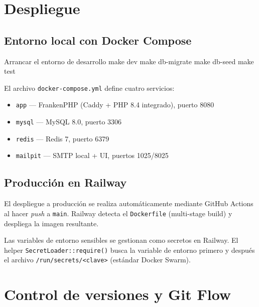 \documentclass[12pt,a4paper,twoside,openright]{report}
\begin{document}
\section{Despliegue}
\label{sec:despliegue}

\subsection{Entorno local con Docker Compose}

\begin{bashcode}{Arrancar el entorno de desarrollo}
make dev
make db-migrate
make db-seed
make test
\end{bashcode}

El archivo \texttt{docker-compose.yml} define cuatro servicios:
\begin{itemize}[nosep]
  \item \texttt{app} — FrankenPHP (Caddy + PHP 8.4 integrado), puerto 8080
  \item \texttt{mysql} — MySQL 8.0, puerto 3306
  \item \texttt{redis} — Redis 7, puerto 6379
  \item \texttt{mailpit} — SMTP local + UI, puertos 1025/8025
\end{itemize}

\subsection{Producción en Railway}

El despliegue a producción se realiza automáticamente mediante GitHub Actions al
hacer \textit{push} a \texttt{main}. Railway detecta el \texttt{Dockerfile}
(multi-stage build) y despliega la imagen resultante.

Las variables de entorno sensibles se gestionan como secretos en Railway. El helper
\texttt{SecretLoader::require()} busca la variable de entorno primero y después el
archivo \texttt{/run/secrets/<clave>} (estándar Docker Swarm).

\section{Control de versiones y Git Flow}
\label{sec:gitflow}
\end{document}
